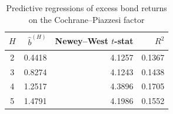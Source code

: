 \begin{table}[htbp]
  \centering
  \caption{Predictive regressions of excess bond returns on the Cochrane--Piazzesi factor}
  \label{tab:q4e}
  \begin{tabular}{crrr}
    \toprule
    $H$ & $\hat{b}^{(H)}$ & Newey--West $t$-stat & $R^2$ \\
    \midrule
    2 & 0.4418 & 4.1257 & 0.1367 \\
    3 & 0.8274 & 4.1243 & 0.1438 \\
    4 & 1.2517 & 4.3896 & 0.1705 \\
    5 & 1.4791 & 4.1986 & 0.1552 \\
    \bottomrule
  \end{tabular}
\end{table}
